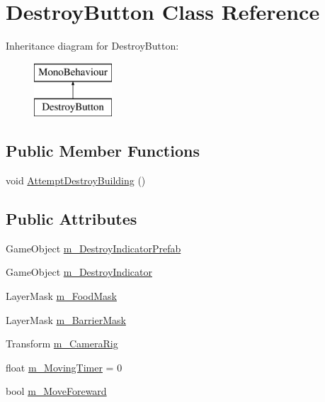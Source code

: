 \hypertarget{class_destroy_button}{}\section{Destroy\+Button Class Reference}
\label{class_destroy_button}
Inheritance diagram for Destroy\+Button\+:\begin{figure}[H]
\begin{center}
\leavevmode
\includegraphics[height=2.000000cm]{class_destroy_button}
\end{center}
\end{figure}
\subsection*{Public Member Functions}
\begin{DoxyCompactItemize}
\item 
void \mbox{\hyperlink{class_destroy_button_a4765380ae0ba91c0a0dbc36930767080}{Attempt\+Destroy\+Building}} ()
\end{DoxyCompactItemize}
\subsection*{Public Attributes}
\begin{DoxyCompactItemize}
\item 
Game\+Object \mbox{\hyperlink{class_destroy_button_a8bbaf530b36d50aeeda63593aac9c180}{m\+\_\+\+Destroy\+Indicator\+Prefab}}
\item 
Game\+Object \mbox{\hyperlink{class_destroy_button_a34804f053a1ab572ea23428a9f9f1946}{m\+\_\+\+Destroy\+Indicator}}
\item 
Layer\+Mask \mbox{\hyperlink{class_destroy_button_ae86fa65d2da82d163307011ea7aa73cb}{m\+\_\+\+Food\+Mask}}
\item 
Layer\+Mask \mbox{\hyperlink{class_destroy_button_a72e3c24e5c8a61639c868f53f5e49c39}{m\+\_\+\+Barrier\+Mask}}
\item 
Transform \mbox{\hyperlink{class_destroy_button_a4845155b4cfca871e5f4aacb22f9f642}{m\+\_\+\+Camera\+Rig}}
\item 
float \mbox{\hyperlink{class_destroy_button_a35d9b71a601dd973e1a7872c83e99b7f}{m\+\_\+\+Moving\+Timer}} = 0
\item 
bool \mbox{\hyperlink{class_destroy_button_a96eb1b0cb43c7cae892139c4f0c910bb}{m\+\_\+\+Move\+Foreward}}
\end{DoxyCompactItemize}


